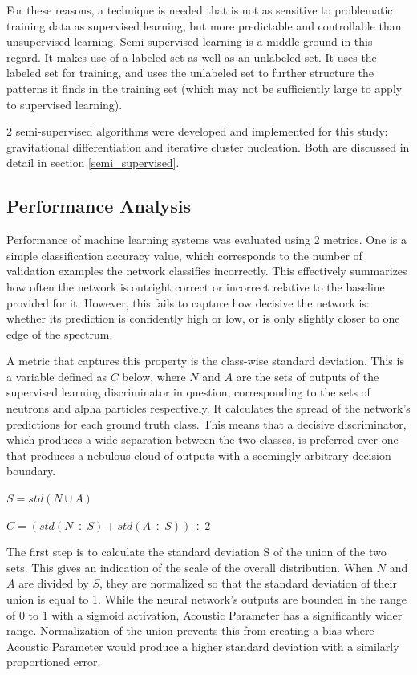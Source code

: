 \documentclass[10pt]{article}
\begin{document}
For these reasons, a technique is needed that is not as sensitive to problematic training data as supervised learning, but more predictable and controllable than unsupervised learning. Semi-supervised learning is a middle ground in this regard. It makes use of a labeled set as well as an unlabeled set. It uses the labeled set for training, and uses the unlabeled set to further structure the patterns it finds in the training set (which may not be sufficiently large to apply to supervised learning).

2 semi-supervised algorithms were developed and implemented for this study: gravitational differentiation and iterative cluster nucleation. Both are discussed in detail in section \ref{semi_supervised}.

\subsection{Performance Analysis}

Performance of machine learning systems was evaluated using 2 metrics. One is a simple classification accuracy value, which corresponds to the number of validation examples the network classifies incorrectly. This effectively summarizes how often the network is outright correct or incorrect relative to the baseline provided for it. However, this fails to capture how decisive the network is: whether its prediction is confidently high or low, or is only slightly closer to one edge of the spectrum.

A metric that captures this property is the class-wise standard deviation. This is a variable defined as $C$ below, where $N$ and $A$ are the sets of outputs of the supervised learning discriminator in question, corresponding to the sets of neutrons and alpha particles respectively. It calculates the spread of the network's predictions for each ground truth class. This means that a decisive discriminator, which produces a wide separation between the two classes, is preferred over one that produces a nebulous cloud of outputs with a seemingly arbitrary decision boundary.

$S=std(N \cup A)$

$C=(std(N \div S) + std(A \div S)) \div 2$

The first step is to calculate the standard deviation S of the union of the two sets. This gives an indication of the scale of the overall distribution. When $N$ and $A$ are divided by $S$, they are normalized so that the standard deviation of their union is equal to 1. While the neural network’s outputs are bounded in the range of 0 to 1 with a sigmoid activation, Acoustic Parameter has a significantly wider range. Normalization of the union prevents this from creating a bias where Acoustic Parameter would produce a higher standard deviation with a similarly proportioned error.
\end{document}
